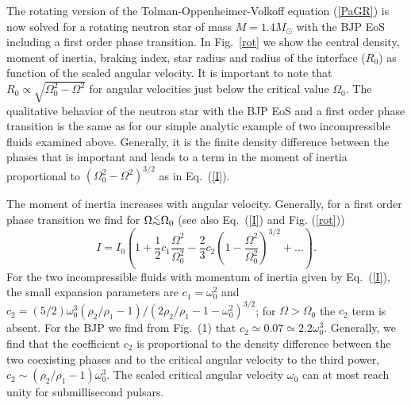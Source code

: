 \begin{multicols}{2}
The rotating version of the Tolman-Oppenheimer-Volkoff
equation (\ref{PaGR}) is now solved for a rotating neutron star of mass   
$M=1.4M_\odot$ with the BJP EoS including a first order phase transition. 
In Fig.\ \ref{rot} we show 
the central density, moment of inertia, braking index, star radius and
radius of the interface ($R_0$) as function of the scaled angular
velocity. It is important to note that $R_0\propto
\sqrt{\Omega_0^2-\Omega^2}$ for angular velocities just below the
critical value $\Omega_0$. The qualitative behavior of the
neutron star with the BJP EoS and a first order phase
transition is the same as for our simple analytic example of two
incompressible fluids examined above.  Generally, it is the finite
density difference between the phases that is important and leads to a
term in the moment of inertia proportional to
$(\Omega_0^2-\Omega^2)^{3/2}$ as in Eq.\  (\ref{I}).

The moment of inertia increases with angular velocity. Generally, for a
first order phase transition we find for 
$\Omega \raisebox{-.5ex}{$\stackrel{<}{\sim}$}\Omega_0$
(see also Eq.\  (\ref{I}) and Fig. (\ref{rot}))
\begin{equation}
  I = I_0\left( 1+\frac{1}{2}c_1\frac{\Omega^2}{\Omega_0^2} -\frac{2}{3}c_2 
                (1-\frac{\Omega^2}{\Omega_0^2})^{3/2} + ...
      \right) . 
  \label{Igen}
\end{equation}
For the two incompressible fluids with momentum of inertia given by
Eq.\  (\ref{I}), the small expansion
parameters are $c_1=\omega_0^2$ and 
$c_2=(5/2)\omega_0^3(\rho_2/\rho_1-1)/(2\rho_2/
\rho_1-1-\omega_0^2)^{3/2}$; for $\Omega>\Omega_0$ the $c_2$ term is absent. 
For the BJP we find from Fig.\ (1) that
$c_2\simeq 0.07\simeq 2.2\omega_0^3$. Generally, we find that the
coefficient $c_2$ is proportional to the density difference between the 
two coexisting phases and to the critical angular velocity to the third power,
$c_2\sim (\rho_2/\rho_1-1)\omega_0^3$. The scaled critical angular velocity
$\omega_0$ can at most reach unity for submillisecond pulsars.



\end{multicols}

